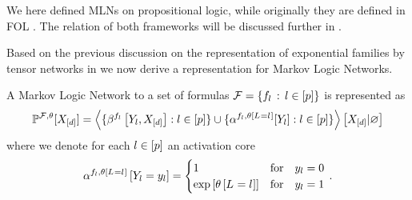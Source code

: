 \begin{remark}
	We here defined MLNs on propositional logic, while originally they are defined in FOL \cite{richardson_markov_2006}.
	The relation of both frameworks will be discussed further in .
\end{remark}




Based on the previous discussion on the representation of exponential families by tensor networks in  we now derive a representation for Markov Logic Networks.


\begin{theorem}\label{the:mlnTensorRep}
	A Markov Logic Network to a set of formulas $\mathcal{F} = \{f_{l} \, : \, l\in[p]\}$ is represented as
	\begin{align*}
		\mathbb{P}^{\mathcal{F},\theta}[X_{[d]}] = 
		\left\langle \{\beta^{f_{l}}\left[Y_{l},X_{[d]}\right] : l\in[p] \} \cup \{\alpha^{f_{l},\theta\left[L_{}=l_{}\right]}[Y_{l}] : l\in[p] \}
		\right\rangle \left[ X_{[d]} | \varnothing \right]
	\end{align*}
	where we denote for each $l\in[p]$ an activation core
	\begin{align*}
		\alpha^{f_{l},\theta\left[L_{}=l_{}\right]}\left[Y_{l}=y_{l}\right]
		= \begin{cases}
			1 & \text{for} \quad y_{l} = 0 \\
			\mathrm{exp}\left[\theta\left[L_{}=l_{}\right]\right] & \text{for} \quad y_{l}  = 1
		\end{cases}  \, .
	\end{align*}
\end{theorem}
